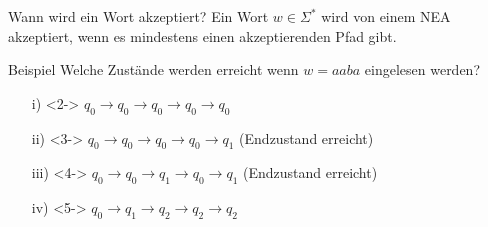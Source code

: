 \begin{frame}{Wann wird ein Wort akzeptiert?}
      Ein Wort $w \in \Sigma^*$ wird von einem NEA akzeptiert, wenn es \alert{mindestens einen} akzeptierenden Pfad gibt.
      \begin{alertblock}{Beispiel}
        Welche Zustände werden erreicht wenn $w = aaba$ eingelesen werden?
        \vspace*{-5mm}
        \begin{center}
            \begin{enumerate}
                \item[i)]<2-> $q_0 \rightarrow q_0 \rightarrow q_0 \rightarrow q_0 \rightarrow q_0$
                \item[ii)]<3-> $q_0 \rightarrow q_0 \rightarrow q_0 \rightarrow q_0 \rightarrow q_1$ (Endzustand erreicht)
                \item[iii)]<4-> $q_0 \rightarrow q_0 \rightarrow q_1 \rightarrow q_0 \rightarrow q_1$ (Endzustand erreicht)
                \item[iv)]<5-> $q_0 \rightarrow q_1 \rightarrow q_2 \rightarrow q_2 \rightarrow q_2$
            \end{enumerate}
        \end{center}
    \end{alertblock}
\end{frame}